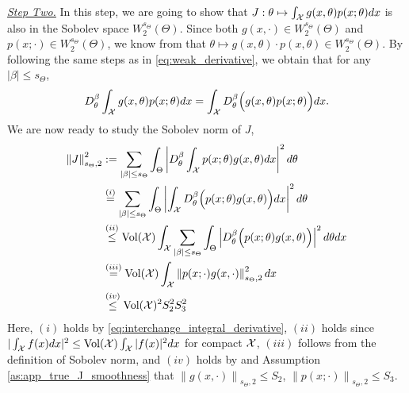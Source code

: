 \underline{\emph{Step Two.}} In this step, we are going to show that $J: \theta \mapsto \int_{\mathcal{X}} g(x, \theta)p(x; \theta) dx$ is also in the Sobolev space $W_2^{s_\Theta} (\Theta)$. 
Since both $g(x, \cdot)\in W_2^{s_\Theta}(\Theta)$ and $p(x; \cdot)\in W_2^{s_\Theta}(\Theta)$, we know from  that $\theta \mapsto g(x, \theta) \cdot p(x,\theta) \in W_2^{s_\Theta}(\Theta)$. 
By following the same steps as in \eqref{eq:weak_derivative}, we obtain that for any $| \beta| \leq s_\Theta$, 
\begin{align}\label{eq:interchange_integral_derivative}
    D_\theta^\beta \int_{\mathcal{X}} g(x, \theta) p(x; \theta) dx = \int_{\mathcal{X}} D_\theta^\beta \Big( g(x, \theta) p(x; \theta) \Big) dx .
\end{align}
We are now ready to study the Sobolev norm of $J$,
\begin{align}\label{eq:J}
    \left\| J \right\|_{s_\Theta, 2}^2 
    &:= \sum_{ | \beta| \leq s_\Theta } \int_\Theta \left| D_\theta^\beta \int_{\mathcal{X}} p(x; \theta) g(x, \theta) dx \right|^2 d\theta \nonumber \\
    &\stackrel{(i)}{=} \sum_{ | \beta| \leq s_\Theta } \int_\Theta \left| \int_{\mathcal{X}} D_\theta^\beta \Big( p(x; \theta) g(x, \theta) \Big) dx \right|^2 d \theta \nonumber \\
    &\stackrel{(ii)}{\leq} \text{Vol}(\mathcal{X}) \int_{\mathcal{X}} \sum_{ | \beta| \leq s_\Theta } \int_\Theta \left| D_\theta^\beta \Big( p(x; \theta) g(x, \theta) \Big) \right|^2 d \theta dx \nonumber \\
    &\stackrel{(iii)}{=} \text{Vol}(\mathcal{X}) \int_{\mathcal{X}} \left\| p(x; \cdot) g(x, \cdot)  \right\|_{s_\Theta, 2}^2 dx \nonumber \\
    &\stackrel{(iv)}{\leq} \text{Vol}(\mathcal{X})^2  S_2^2 S_3^2
\end{align}
Here, $(i)$ holds by \eqref{eq:interchange_integral_derivative}, $(ii)$ holds since $| \int_{\mathcal{X}} f(x) dx |^2 \leq \text{Vol}(\mathcal{X}) \int_{\mathcal{X}} | f(x) |^2 dx $ for compact $\mathcal{X}$, 
$(iii)$ follows from the definition of Sobolev norm, and $(iv)$ holds by  and Assumption \ref{as:app_true_J_smoothness} that $\left\| g(x, \cdot) \right\|_{s_\Theta, 2} \leq S_2$, $\left\| p(x; \cdot) \right\|_{s_\Theta, 2} \leq S_3$. 

